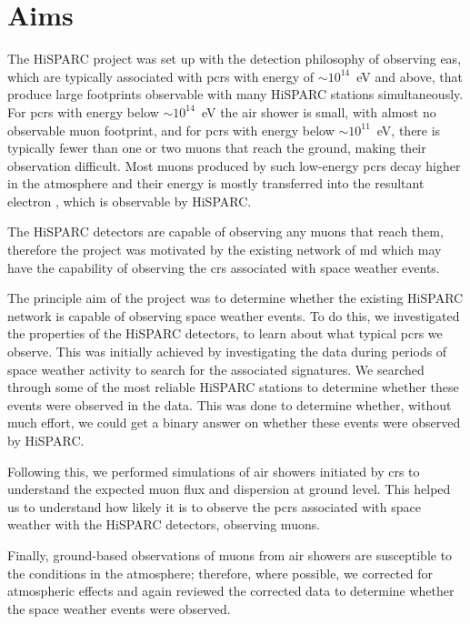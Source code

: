 \section{Aims}\label{sec:HS_aims}
The HiSPARC project was set up with the detection philosophy of observing \gls{eas}, which are typically associated with \gls{pcr}s with energy of $\sim10^{14}$~eV and above, that produce large footprints observable with many HiSPARC stations simultaneously. For \gls{pcr}s with energy below $\sim10^{14}$~eV the air shower is small, with almost no observable muon footprint, and for \gls{pcr}s with energy below $\sim10^{11}$~eV, there is typically fewer than one or two muons that reach the ground, making their observation difficult. Most muons produced by such low-energy \glspl{pcr} decay higher in the atmosphere and their energy is mostly transferred into the resultant electron \citep{van_dam_hisparc_2020}, which is observable by HiSPARC.

The HiSPARC detectors are capable of observing any muons that reach them, therefore the project was motivated by the existing network of \gls{md} which may have the capability of observing the \gls{cr}s associated with space weather events.

The principle aim of the project was to determine whether the existing HiSPARC network is capable of observing space weather events. To do this, we investigated the properties of the HiSPARC detectors, to learn about what typical \glspl{pcr} we observe. This was initially achieved by investigating the data during periods of space weather activity to search for the associated signatures. We searched through some of the most reliable HiSPARC stations to determine whether these events were observed in the data. This was done to determine whether, without much effort, we could get a binary answer on whether these events were observed by HiSPARC.

Following this, we performed simulations of air showers initiated by \glspl{cr} to understand the expected muon flux and dispersion at ground level. This helped us to understand how likely it is to observe the \glspl{pcr} associated with space weather with the HiSPARC detectors, observing muons.

Finally, ground-based observations of muons from air showers are susceptible to the conditions in the atmosphere; therefore, where possible, we corrected for atmospheric effects and again reviewed the corrected data to determine whether the space weather events were observed.

